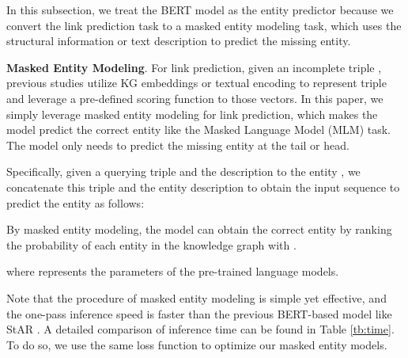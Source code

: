 \documentclass[runningheads]{llncs}
\begin{document}
\label{sec:masked entity prediction}


In this subsection, we treat the BERT model as the entity predictor because we convert the link prediction task to a masked entity modeling task, which uses the structural information or text description to predict the missing entity.

\textbf{Masked Entity Modeling}.
For link prediction, given an incomplete triple , previous studies utilize KG embeddings or textual encoding to represent triple and leverage a pre-defined scoring function to those vectors. 
In this paper, we simply leverage masked entity modeling for link prediction, which makes the model predict the correct entity  like the Masked Language Model (MLM) task.
The model only needs to predict the missing entity at the tail or head\cite{zhang2023multimodal}.

Specifically, given a querying triple  and the description  to the entity , we concatenate this triple and the entity description  to obtain the input sequence  to predict the entity  as follows:


By masked entity modeling, the model can obtain the correct entity  by ranking the probability of each entity in the knowledge graph with .

where  represents the parameters of the pre-trained language models.

\let\mc\multicolumn


\begin{table*}[thbp]
\caption{Inference efficiency comparison.  is the length of the entity description. ,  and  are the numbers of all unique entities, relations and triples in the graph respectively. Usually,  exceeds hundreds of thousands and is much greater than .}
\label{tab:results-inductive}
\centering
{}

\label{tb:time}
\end{table*} 
Note that the procedure of masked entity modeling is simple yet effective, and the one-pass inference speed is faster than the previous BERT-based model like StAR \cite{STAR}.
A detailed comparison of inference time can be found in Table \ref{tb:time}.
To do so, we use the same loss function to optimize our masked entity models.
\end{document}
